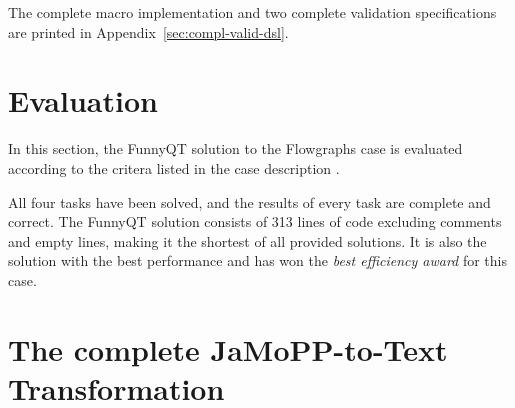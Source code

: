 \documentclass[submission]{eptcs}
\begin{document}
The complete macro implementation and two complete validation specifications
are printed in Appendix~\ref{sec:compl-valid-dsl}.


\section{Evaluation}
\label{sec:evaluation}


In this section, the FunnyQT solution to the Flowgraphs case is evaluated
according to the critera listed in the case description
\cite{flowgraphcasedesc}.

All four tasks have been solved, and the results of every task are complete and
correct.  The FunnyQT solution consists of 313 lines of code excluding comments
and empty lines, making it the shortest of all provided solutions.  It is also
the solution with the best performance and has won the \emph{best efficiency
  award} for this case.






\appendix
\newpage
\section{The complete JaMoPP-to-Text Transformation}
\label{sec:complete-jamopp-text}
\end{document}
